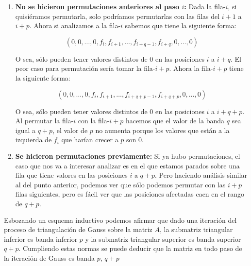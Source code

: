 \begin{enumerate}
    \item {\bf No se hicieron permutaciones anteriores al paso $i$:} Dada la fila-$i$, si quisiéramos permutarla, solo podríamos permutarlas con las filas del $i + 1$ a $i + p$. Ahora si analizamos a la fila-$i$ sabemos que tiene la siguiente forma:

    \begin{displaymath}
        (0, 0, \dots, 0, f_i, f_{i + 1}, \dots, f_{i + q - 1}, f_{i + q}, 0, \dots, 0)
    \end{displaymath}

    O sea, sólo pueden tener valores distintos de $0$ en las posiciones $i$ a $i + q$. El peor caso para permutación sería tomar la fila-${i + p}$. Ahora la fila-${i + p}$ tiene la siguiente forma:

    \begin{displaymath}
        (0, 0, \dots, 0, f_i, f_{i + 1}, \dots, f_{i + q + p - 1}, f_{i + q + p}, 0, \dots, 0)
    \end{displaymath}

    O sea, sólo pueden tener valores distintos de $0$ en las posiciones $i$ a $i + q + p$. Al permutar la fila-$i$ con la fila-${i + p}$ hacemos que el valor de la banda $q$ sea igual a $q + p$, el valor de $p$ no aumenta porque los valores que están a la izquierda de $f_i$ que harían crecer a $p$ son 0.

    \item {\bf Se hicieron permutaciones previamente:} Si ya hubo permutaciones, el caso que nos va a interesar analizar es en el que estamos parados sobre una fila que tiene valores en las posiciones $i$ a $q + p$. Pero haciendo análisis similar al del punto anterior, podemos ver que sólo podemos permutar con las $i + p$ filas siguientes, pero es fácil ver que las posiciones afectadas caen en el rango de $q + p$.
\end{enumerate}

Esbozando un esquema inductivo podemos afirmar que dado una iteración del proceso de triangulación de Gauss sobre la matriz $A$, la submatriz triangular inferior es banda inferior $p$ y la submatriz triangular superior es banda superior $q + p$. Cumpliendo estas normas se puede deducir que la matriz en todo paso de la iteración de Gauss es banda $p$, $q + p$
